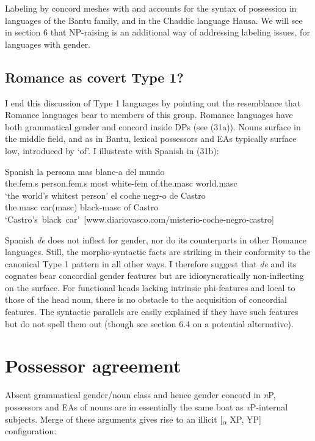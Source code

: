 \documentclass[output=paper
,modfonts
,nonflat]{langsci/langscibook}
\begin{document}
Labeling by concord meshes with and accounts for the syntax of possession in languages of the Bantu family, and in the Chaddic language Hausa. We will see in section 6 that NP-raising is an additional way of addressing labeling issues, for languages with gender. 

\subsection{Romance as covert Type 1?}

I end this discussion of Type 1 languages by pointing out the resemblance that Romance languages bear to members of this group. Romance languages have both grammatical gender and concord inside DPs (see (31a)). Nouns surface in the middle field, and as in Bantu, lexical possessors and EAs typically surface low, introduced by ‘of’. I illustrate with Spanish in (31b):

\begin{exe}
	\ex Spanish
	\xlist
	\ex 
	\gll la           persona       mas   blanc-a      del mundo \\
	the.fem.s   person.fem.s   most white-fem     of.the.masc world.masc\\
	\glt `the world's whitest person'  	
	\ex 
	\gll el       coche       negr-o      de Castro \\
	the.masc car(masc)  black-masc  of Castro\\
	\glt \mbox{`Castro's black car' [www.diariovasco.com/misterio-coche-negro-castro]}
	\endxlist
\end{exe}
Spanish \textit{de} does not inflect for gender, nor do its counterparts in other Romance languages. Still, the morpho-syntactic facts are striking in their conformity to the canonical Type 1 pattern in all other ways. I therefore suggest that \textit{de} and its cognates bear concordial gender features but are idiosyncratically non-inflecting on the surface. For functional heads lacking intrinsic phi-features and local to those of the head noun, there is no obstacle to the acquisition of concordial features. The syntactic parallels are easily explained if they have such features but do not spell them out (though see section 6.4 on a potential alternative).       

\section{Possessor agreement}
Absent grammatical gender/noun class and hence gender concord in \textit{n}P, possessors and EAs of nouns are in essentially the same boat as \textit{v}P-internal subjects. Merge of these arguments gives rise to an illicit [\textsubscript{${\alpha}$} XP, YP] configuration:
\end{document}
